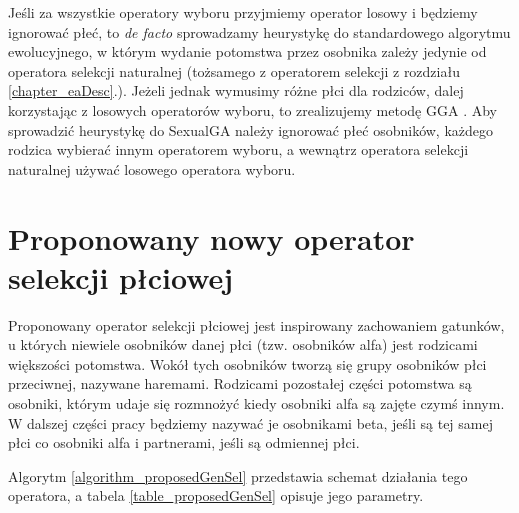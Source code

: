 \documentclass[twoside]{iisthesis}
\newcommand{\defacto}{\emph{de facto }}
\begin{document}
Jeśli za wszystkie operatory wyboru przyjmiemy operator losowy i będziemy ignorować płeć, to \defacto  sprowadzamy heurystykę do standardowego algorytmu ewolucyjnego, w którym wydanie potomstwa przez osobnika zależy jedynie od operatora selekcji naturalnej (tożsamego z operatorem selekcji z rozdziału \ref{chapter_eaDesc}.).
Jeżeli jednak wymusimy różne płci dla rodziców, dalej korzystając z losowych operatorów wyboru, to zrealizujemy metodę GGA \cite{GGA}.
Aby sprowadzić heurystykę do SexualGA \cite{SexualGA} należy ignorować płeć osobników, każdego rodzica wybierać innym operatorem wyboru, a wewnątrz operatora selekcji naturalnej używać losowego operatora wyboru.

\section{Proponowany nowy operator selekcji płciowej} \label{section_proposedGenSel}

Proponowany operator selekcji płciowej jest inspirowany zachowaniem gatunków, u których niewiele osobników danej płci (tzw. osobników alfa) jest rodzicami większości potomstwa. Wokół tych osobników tworzą się grupy osobników płci przeciwnej, nazywane haremami. Rodzicami pozostałej części potomstwa są osobniki, którym udaje się rozmnożyć kiedy osobniki alfa są zajęte czymś innym. W dalszej części pracy będziemy nazywać je osobnikami beta, jeśli są tej samej płci co osobniki alfa i partnerami, jeśli są odmiennej płci.

Algorytm \ref{algorithm_proposedGenSel} przedstawia schemat działania tego operatora, a tabela \ref{table_proposedGenSel} opisuje jego parametry.
\end{document}
